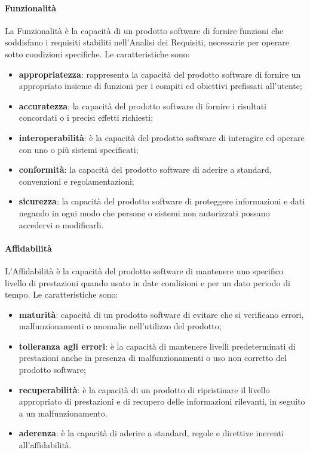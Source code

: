 \paragraph{Funzionalità}
La Funzionalità è la capacità di un prodotto software di fornire funzioni che soddisfano i requisiti stabiliti nell'Analisi dei Requisiti, necessarie per operare sotto condizioni specifiche.
Le caratteristiche sono:
\begin{itemize}
\item \textbf{appropriatezza}: rappresenta la capacità del prodotto software di fornire un appropriato insieme di funzioni per i compiti ed obiettivi prefissati all'utente;
\item \textbf{accuratezza}: la capacità del prodotto software di fornire i risultati concordati o i precisi effetti richiesti;
\item \textbf{interoperabilità}: è la capacità del prodotto software di interagire ed operare con uno o più sistemi specificati;
\item \textbf{conformità}: la capacità del prodotto software di aderire a standard, convenzioni e regolamentazioni;
\item \textbf{sicurezza}: la capacità del prodotto software di proteggere informazioni e dati negando in ogni modo che persone o sistemi non autorizzati possano accedervi o modificarli.
\end{itemize}

\paragraph{Affidabilità}
L'Affidabilità è la capacità del prodotto software di mantenere uno specifico livello di prestazioni quando usato in date condizioni e per un dato periodo di tempo. Le caratteristiche sono:
\begin{itemize}
\item \textbf{maturità}: capacità di un prodotto software di evitare che si verificano errori, malfunzionamenti o anomalie nell'utilizzo del prodotto;
\item \textbf{tolleranza agli errori}: è la capacità di mantenere livelli predeterminati di prestazioni anche in presenza di malfunzionamenti o uso non corretto del prodotto software;
\item \textbf{recuperabilità}: è la capacità di un prodotto di ripristinare il livello appropriato di prestazioni e di recupero delle informazioni rilevanti, in seguito a un malfunzionamento.
\item \textbf{aderenza}: è la capacità di aderire a standard, regole e direttive inerenti all'affidabilità.
\end{itemize}

